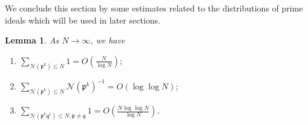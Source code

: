 \documentclass[11pt]{amsart}
\newtheorem{lemma}{Lemma}[section]
\theoremstyle{definition}
\newcommand{\NN}{{\mathcal N}}
\newcommand{\mf}{\mathfrak}
\newcommand{\e}{\epsilon}
\newcommand{\WS}[1]{{\color{blue}{{#1}}}}
\begin{document}
We conclude this section by some estimates related to the distributions of prime ideals which will be used in later sections.

\begin{lemma}\label{l2}
As $N\to\infty$, we have
\begin{enumerate}
    \item $\sum_{\NN(\mf p^{k})\leq N} 1=O\left(\frac{N}{\log N}\right);$
    \item $\sum_{\NN(\mf p^{k})\leq N} \NN(\mf p^{k})^{-1}=O(\log\log N);$
 \item $\sum_{\NN(\mf p^{k}\mf q^{\ell})\leq N, \mf p\neq \mf q} 1=O\left(\frac{N\log\log N}{\log N}\right)$.
\end{enumerate}
%
%
\end{lemma}
\end{document}
